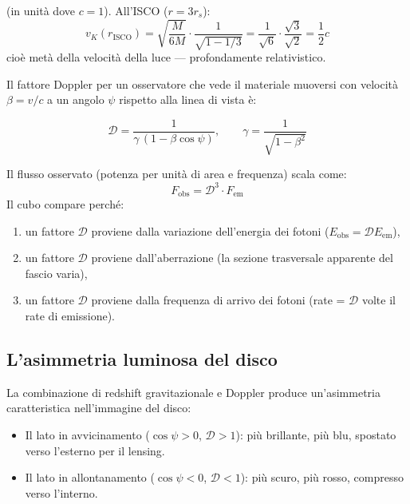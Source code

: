 \documentclass[12pt, a4paper, twoside]{article}
\newenvironment{physbox}[1]{%
  \begin{tcolorbox}[equationbox, title={#1}]
}{%
  \end{tcolorbox}
}
\theoremstyle{definition}
\newcommand{\RS}{r_{\!s}}          %
\newcommand{\Risco}{r_{\!\text{ISCO}}} %
\begin{document}
(in unità dove $c = 1$). All'ISCO ($r = 3\RS$):
\begin{equation}
  v_K(\Risco) = \sqrt{\frac{M}{6M}} \cdot \frac{1}{\sqrt{1-1/3}} = \frac{1}{\sqrt{6}} \cdot \frac{\sqrt{3}}{\sqrt{2}} = \frac{1}{2}c
\end{equation}
cioè metà della velocità della luce — profondamente relativistico.

Il fattore Doppler per un osservatore che vede il materiale muoversi con
velocità $\beta = v/c$ a un angolo $\psi$ rispetto alla linea di vista è:

\begin{physbox}{Fattore Doppler Relativistico}
\begin{equation}
  \mathcal{D} = \frac{1}{\gamma\,(1 - \beta\cos\psi)},
  \qquad \gamma = \frac{1}{\sqrt{1-\beta^2}}
  \label{eq:doppler}
\end{equation}
\end{physbox}

Il flusso osservato (potenza per unità di area e frequenza) scala come:
\begin{equation}
  F_{\text{obs}} = \mathcal{D}^3 \cdot F_{\text{em}}
\end{equation}
Il cubo compare perché:
\begin{enumerate}
  \item un fattore $\mathcal{D}$ proviene dalla variazione dell'energia dei fotoni
        ($E_{\text{obs}} = \mathcal{D} E_{\text{em}}$),
  \item un fattore $\mathcal{D}$ proviene dall'aberrazione (la sezione trasversale
        apparente del fascio varia),
  \item un fattore $\mathcal{D}$ proviene dalla frequenza di arrivo dei fotoni
        (rate = $\mathcal{D}$ volte il rate di emissione).
\end{enumerate}

\subsection{L'asimmetria luminosa del disco}

La combinazione di redshift gravitazionale e Doppler produce un'asimmetria
caratteristica nell'immagine del disco:
\begin{itemize}
  \item Il lato in avvicinamento ($\cos\psi > 0$, $\mathcal{D} > 1$): più
        brillante, più blu, spostato verso l'esterno per il lensing.
  \item Il lato in allontanamento ($\cos\psi < 0$, $\mathcal{D} < 1$): più
        scuro, più rosso, compresso verso l'interno.
\end{itemize}
\end{document}
